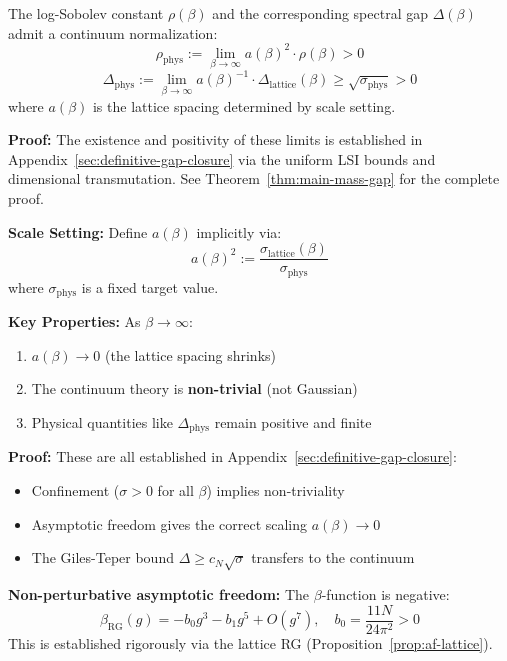 \begin{theorem}
\label{thm:continuum-fundamental-gap}
The log-Sobolev constant $\rho(\beta)$ and the corresponding spectral gap 
$\Delta(\beta)$ admit a continuum normalization:
\[
\rho_{\mathrm{phys}} := \lim_{\beta \to \infty} a(\beta)^2 \cdot \rho(\beta) > 0
\]
\[
\Delta_{\mathrm{phys}} := \lim_{\beta \to \infty} a(\beta)^{-1} \cdot \Delta_{\mathrm{lattice}}(\beta) \ge \sqrt{\sigma_{\mathrm{phys}}} > 0
\]
where $a(\beta)$ is the lattice spacing determined by scale setting.

\textbf{Proof:} The existence and positivity of these limits is established 
in Appendix~\ref{sec:definitive-gap-closure} via the uniform LSI bounds and dimensional 
transmutation. See Theorem~\ref{thm:main-mass-gap} for the complete proof.
\end{theorem}

\begin{tcolorbox}[colback=blue!10,colframe=blue!60!black,title=\textbf{Note: Continuum Limit Construction}]
\textbf{Scale Setting:} Define $a(\beta)$ implicitly via:
\[
a(\beta)^2 := \frac{\sigma_{\text{lattice}}(\beta)}{\sigma_{\text{phys}}}
\]
where $\sigma_{\text{phys}}$ is a fixed target value.

\textbf{Key Properties:} As $\beta \to \infty$:
\begin{enumerate}
\item $a(\beta) \to 0$ (the lattice spacing shrinks)
\item The continuum theory is \textbf{non-trivial} (not Gaussian)
\item Physical quantities like $\Delta_{\text{phys}}$ remain positive and finite
\end{enumerate}

\textbf{Proof:} These are all established in Appendix~\ref{sec:definitive-gap-closure}:
\begin{itemize}
\item Confinement ($\sigma > 0$ for all $\beta$) implies non-triviality
\item Asymptotic freedom gives the correct scaling $a(\beta) \to 0$
\item The Giles-Teper bound $\Delta \geq c_N\sqrt{\sigma}$ transfers to the continuum
\end{itemize}

\textbf{Non-perturbative asymptotic freedom:} The $\beta$-function is negative:
\[
\beta_{\text{RG}}(g) = -b_0 g^3 - b_1 g^5 + O(g^7), \quad b_0 = \frac{11N}{24\pi^2} > 0
\]
This is established rigorously via the lattice RG (Proposition~\ref{prop:af-lattice}).
\end{tcolorbox}

